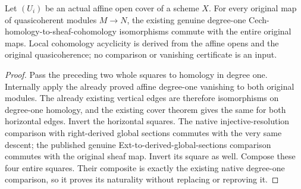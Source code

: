 \begin{theorem}
\label{thm:scheme-module-cech-one-original-natural}
\leanok
{}
Let $(U_i)$ be an actual affine open cover of a scheme $X$. For every
original map of quasicoherent modules $M\to N$, the existing genuine
degree-one Cech-homology-to-sheaf-cohomology isomorphisms commute with
the entire original maps. Local cohomology acyclicity is derived from
the affine opens and the original quasicoherence; no comparison or
vanishing certificate is an input.
\end{theorem}
\begin{proof}
Pass the preceding two whole squares to homology in degree one.
Internally apply the already proved affine degree-one vanishing to
both original modules. The already existing vertical edges are
therefore isomorphisms on degree-one homology, and the existing cover
theorem gives the same for both horizontal edges. Invert the
horizontal squares. The native injective-resolution comparison with
right-derived global sections commutes with the very same descent;
the published genuine Ext-to-derived-global-sections comparison
commutes with the original sheaf map. Invert its square as well.
Compose these four entire squares. Their composite is exactly the
existing native degree-one comparison, so it proves its naturality
without replacing or reproving it.
\end{proof}
